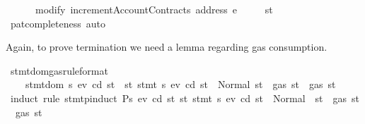 \begin{isabellebody}
\ \ \ \ \ \ modify\ {\isacharparenleft}{\kern0pt}incrementAccountContracts\ {\isacharparenleft}{\kern0pt}address\ e{\isacharparenright}{\kern0pt}{\isacharparenright}{\kern0pt}\isanewline
\ \ \ \ {\isacharbraceright}{\kern0pt}{\isacharparenright}{\kern0pt}\ st{\isachardoublequoteclose}\isanewline
%
\isadelimproof
%
\endisadelimproof
%
\isatagproof
{}\isamarkupfalse%
\ pat{\isacharunderscore}{\kern0pt}completeness\ auto%
\endisatagproof
{\isafoldproof}%
%
\isadelimproof
%
\endisadelimproof
%
\isadelimdocument
%
\endisadelimdocument
%
\isatagdocument
%
\isamarkuptrue%
%
\endisatagdocument
{\isafolddocument}%
%
\isadelimdocument
%
\endisadelimdocument
%
\begin{isamarkuptext}%
Again, to prove termination we need a lemma regarding gas consumption.%
\end{isamarkuptext}\isamarkuptrue%
\isamarkupfalse%
\ stmt{\isacharunderscore}{\kern0pt}dom{\isacharunderscore}{\kern0pt}gas{\isacharbrackleft}{\kern0pt}rule{\isacharunderscore}{\kern0pt}format{\isacharbrackright}{\kern0pt}{\isacharcolon}{\kern0pt}\isanewline
\ \ \ \ {\isachardoublequoteopen}stmt{\isacharunderscore}{\kern0pt}dom\ {\isacharparenleft}{\kern0pt}s{}{\isacharcomma}{\kern0pt}\ ev{}{\isacharcomma}{\kern0pt}\ cd{}{\isacharcomma}{\kern0pt}\ st{}{\isacharparenright}{\kern0pt}\ {\isasymLongrightarrow}\ {\isacharparenleft}{\kern0pt}{\isasymforall}st{}{\isacharprime}{\kern0pt}{\isachardot}{\kern0pt}\ stmt\ s{}\ ev{}\ cd{}\ st{}\ {\isacharequal}{\kern0pt}\ Normal{\isacharparenleft}{\kern0pt}{\isacharparenleft}{\kern0pt}{\isacharparenright}{\kern0pt}{\isacharcomma}{\kern0pt}\ st{}{\isacharprime}{\kern0pt}{\isacharparenright}{\kern0pt}\ {\isasymlongrightarrow}\ gas\ st{}{\isacharprime}{\kern0pt}\ {\isasymle}\ gas\ st{}{\isacharparenright}{\kern0pt}{\isachardoublequoteclose}\isanewline
%
\isadelimproof
%
\endisadelimproof
%
\isatagproof
{}\isamarkupfalse%
\ {\isacharparenleft}{\kern0pt}induct\ rule{\isacharcolon}{\kern0pt}\ stmt{\isachardot}{\kern0pt}pinduct{\isacharbrackleft}{\kern0pt}\ {\isacharquery}{\kern0pt}P{\isacharequal}{\kern0pt}{\isachardoublequoteopen}{\isasymlambda}s{}\ ev{}\ cd{}\ st{}{\isachardot}{\kern0pt}\ {\isacharparenleft}{\kern0pt}{\isasymforall}st{}{\isacharprime}{\kern0pt}{\isachardot}{\kern0pt}\ stmt\ s{}\ ev{}\ cd{}\ st{}\ {\isacharequal}{\kern0pt}\ Normal\ {\isacharparenleft}{\kern0pt}{\isacharparenleft}{\kern0pt}{\isacharparenright}{\kern0pt}{\isacharcomma}{\kern0pt}\ st{}{\isacharprime}{\kern0pt}{\isacharparenright}{\kern0pt}\ {\isasymlongrightarrow}\ gas\ st{}{\isacharprime}{\kern0pt}\ {\isasymle}\ gas\ st{}{\isacharparenright}{\kern0pt}{\isachardoublequoteclose}{\isacharbrackright}{\kern0pt}{\isacharparenright}{\kern0pt}\isanewline

\end{isabellebody}
